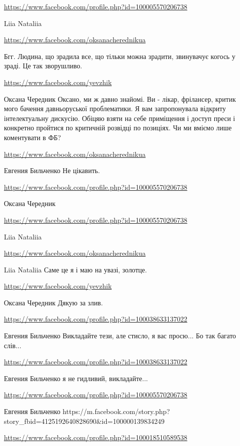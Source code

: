 \documentclass[a4paper,11pt]{extreport}
\begin{document}
\begin{itemize}
\url{https://www.facebook.com/profile.php?id=100005570206738}

Liia Nataliia

\url{https://www.facebook.com/oksanacherednikua}

Бгг. Людина, що зрадила все, що тільки можна зрадити, звинувачує когось у зраді. Це так зворушливо.

\begin{itemize}
\url{https://www.facebook.com/yevzhik}

Оксана Чередник Оксано, ми ж давно знайомі. Ви - лікар, фрілансер, критик мого бачення давньоруської проблематики. Я вам запропонувала відкриту інтелектуальну дискусію. Обіцяю взяти на себе приміщення і доступ преси і конкретно пройтися по критичній розвідці по позиціях. Чи ми вміємо лише коментувати в ФБ?

\url{https://www.facebook.com/oksanacherednikua}

Евгения Бильченко Не цікавить.

\url{https://www.facebook.com/profile.php?id=100005570206738}

Оксана Чередник

\url{https://www.facebook.com/profile.php?id=100005570206738}

Liia Nataliia

\url{https://www.facebook.com/oksanacherednikua}

Liia Nataliia Саме це я і маю на увазі, золотце.

\url{https://www.facebook.com/yevzhik}

Оксана Чередник Дякую за злив.

\url{https://www.facebook.com/profile.php?id=100038633137022}

Евгения Бильченко Викладайте тези, але стисло, я вас просю... Бо так багато слів...

\url{https://www.facebook.com/profile.php?id=100038633137022}

Евгения Бильченко я не гидливий, викладайте...

\url{https://www.facebook.com/profile.php?id=100005570206738}

Евгения Бильченко https://m.facebook.com/story.php?story_fbid=4125192640828690&id=100000139834249

\url{https://www.facebook.com/profile.php?id=100018510589538}


\end{itemize}
\end{itemize}
\end{document}
